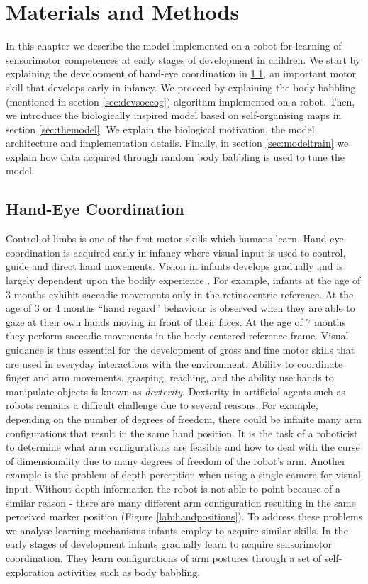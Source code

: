 \chapter{Materials and Methods}
\label{chap:methods}

In this chapter we describe the model implemented on a robot for learning of sensorimotor competences at early stages of development in children. 
We start by explaining the development of hand-eye coordination in \ref{sec:hecoord}, an important motor skill that develops early in infancy. We proceed by explaining the body babbling (mentioned in section \ref{sec:devsoccog}) algorithm  implemented on a robot. Then, we introduce the biologically inspired model based on self-organising maps in section \ref{sec:themodel}. We explain the biological motivation, the model architecture and implementation details. Finally, in section \ref{sec:modeltrain} we explain how data acquired through random body babbling is used to tune the model.

\section{Hand-Eye Coordination}
\label{sec:hecoord}

Control of limbs is one of the first motor skills which humans learn.
Hand-eye coordination is acquired early in infancy where visual input is used to control, guide and direct hand movements. 
Vision in infants develops gradually and is largely dependent upon the bodily experience \citep{pmid9455172}. For example, infants at the age of 3 months exhibit saccadic movements only in the retinocentric reference. At the age of 3 or 4 months ``hand regard'' behaviour is observed when they are able to gaze at their own hands moving in front of their faces. At the age of 7 months they perform saccadic movements in the body-centered reference frame.
Visual guidance is thus essential for the development of gross and fine motor skills that are used in everyday interactions with the environment.
Ability to coordinate finger and arm movements, grasping, reaching, and the ability use hands to manipulate objects is known as \emph{dexterity}. 
Dexterity in artificial agents such as robots remains a difficult challenge due 
to several reasons. 
For example, depending on the number of degrees of freedom, there could 
be infinite many arm configurations that result in the same hand position. 
It is the task of a roboticist to determine what arm configurations are feasible and how to deal with the curse of dimensionality due to many degrees of freedom of the robot's arm. Another example is the problem of depth perception when using a single camera for visual input. Without depth information the robot is not able to point because of a similar reason - there are many different arm configuration resulting in the same perceived marker position (Figure \ref{lab:handpositions}). To address these problems we analyse learning mechanisms infants employ to acquire similar skills.
In the early stages of development infants gradually learn to acquire  sensorimotor coordination.
They learn configurations of arm postures through a set of self-exploration activities such as body babbling. 


